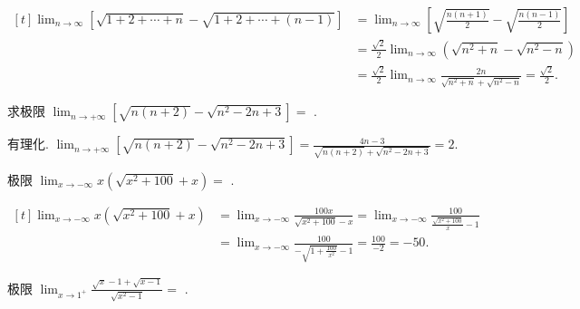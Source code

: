 \begin{analysis}
  $\begin{aligned}[t]
      \lim_{n \to \infty} \left[ \sqrt{1+2+\cdots+n}-\sqrt{1+2+\cdots+(n-1)} \right]
       & = \lim_{n \to \infty} \left[ \sqrt{\frac{n(n+1)}{2}}-\sqrt{\frac{n(n-1)}{2}} \right]  \\
       & = \frac{\sqrt{2}}{2} \lim_{n \to \infty} \left( \sqrt{n^{2}+n}-\sqrt{n^{2}-n} \right) \\
       & = \frac{\sqrt{2}}{2} \lim_{n \to \infty} \frac{2 n}{\sqrt{n^{2}+n}+\sqrt{n^{2}-n}}
      = \frac{\sqrt{2}}{2}.
    \end{aligned}$
\end{analysis}

\begin{question}
  求极限 $\lim_{n \to +\infty}\left[ \sqrt{n(n+2)}-\sqrt{n^{2}-2 n+3} \right] =$
  \fillin[$2$].
\end{question}

\begin{analysis}
  有理化.
  $\lim_{n \to +\infty}\left[ \sqrt{n(n+2)}-\sqrt{n^{2}-2 n+3} \right]
    = \frac{4 n-3}{\sqrt{n(n+2)}+\sqrt{n^{2}-2 n+3}}
    = 2$.
\end{analysis}

\begin{question}
  极限 $\lim_{x \to -\infty} x\left( \sqrt{x^2+100}+x \right) =$
  \fillin[$-50$].
\end{question}

\begin{analysis}
  $\begin{aligned}[t]
      \lim_{x \to -\infty} x\left( \sqrt{x^2+100}+x \right)
       & = \lim_{x \to -\infty} \frac{100x}{\sqrt{x^2+100}-x}
      = \lim_{x \to -\infty} \frac{100}{\frac{\sqrt{x^2+100}}{x}-1}     \\
       & = \lim_{x \to -\infty} \frac{100}{-\sqrt{1+\frac{100}{x^2}}-1}
      = \frac{100}{-2}
      = -50.
    \end{aligned}$
\end{analysis}

\begin{question}
  极限 $\lim_{x \to 1^{+}} \frac{\sqrt{x}-1+\sqrt{x-1}}{\sqrt{x^{2}-1}} =$
  .
\end{question}

